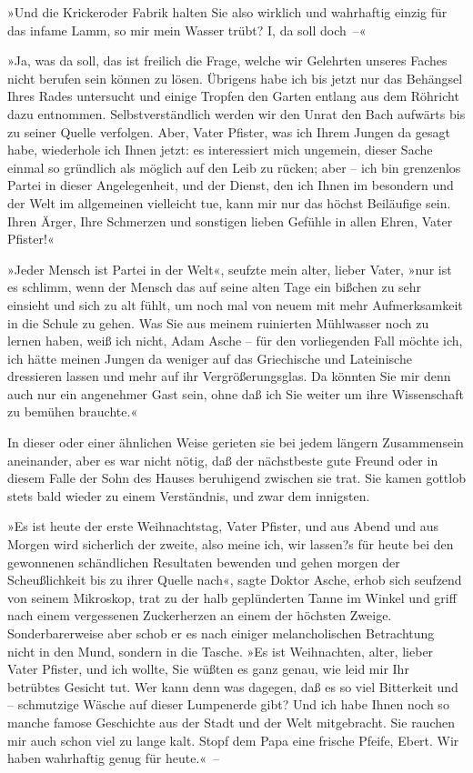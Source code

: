 »Und die Krickeroder Fabrik halten Sie also wirklich und wahrhaftig
einzig für das infame Lamm, so mir mein Wasser trübt? I, da soll
doch~–«

»Ja, was da soll, das ist freilich die Frage, welche wir Gelehrten
unseres Faches nicht berufen sein können zu lösen. Übrigens habe
ich bis jetzt nur das Behängsel Ihres Rades untersucht und einige
Tropfen den Garten entlang aus dem Röhricht dazu entnommen.
Selbstverständlich werden wir den Unrat den Bach aufwärts bis zu
seiner Quelle verfolgen. Aber, Vater Pfister, was ich Ihrem Jungen
da gesagt habe, wiederhole ich Ihnen jetzt: es interessiert mich
ungemein, dieser Sache einmal so gründlich als möglich auf den Leib
zu rücken; aber – ich bin grenzenlos Partei in dieser
Angelegenheit, und der Dienst, den ich Ihnen im besondern und der
Welt im allgemeinen vielleicht tue, kann mir nur das höchst
Beiläufige sein. Ihren Ärger, Ihre Schmerzen und sonstigen lieben
Gefühle in allen Ehren, Vater Pfister!«

»Jeder Mensch ist Partei in der Welt«, seufzte mein alter, lieber
Vater, »nur ist es schlimm, wenn der Mensch das auf seine alten
Tage ein bißchen zu sehr einsieht und sich zu alt fühlt, um noch
mal von neuem mit mehr Aufmerksamkeit in die Schule zu gehen. Was
Sie aus meinem ruinierten Mühlwasser noch zu lernen haben, weiß ich
nicht, Adam Asche – für den vorliegenden Fall möchte ich, ich hätte
meinen Jungen da weniger auf das Griechische und Lateinische
dressieren lassen und mehr auf ihr Vergrößerungsglas. Da könnten
Sie mir denn auch nur ein angenehmer Gast sein, ohne daß ich Sie
weiter um ihre Wissenschaft zu bemühen brauchte.«

In dieser oder einer ähnlichen Weise gerieten sie bei jedem längern
Zusammensein aneinander, aber es war nicht nötig, daß der
nächstbeste gute Freund oder in diesem Falle der Sohn des Hauses
beruhigend zwischen sie trat. Sie kamen gottlob stets bald wieder
zu einem Verständnis, und zwar dem innigsten.

»Es ist heute der erste Weihnachtstag, Vater Pfister, und aus Abend
und aus Morgen wird sicherlich der zweite, also meine ich, wir
lassen?s für heute bei den gewonnenen schändlichen Resultaten
bewenden und gehen morgen der Scheußlichkeit bis zu ihrer Quelle
nach«, sagte Doktor Asche, erhob sich seufzend von seinem
Mikroskop, trat zu der halb geplünderten Tanne im Winkel und griff
nach einem vergessenen Zuckerherzen an einem der höchsten Zweige.
Sonderbarerweise aber schob er es nach einiger melancholischen
Betrachtung nicht in den Mund, sondern in die Tasche. »Es ist
Weihnachten, alter, lieber Vater Pfister, und ich wollte, Sie
wüßten es ganz genau, wie leid mir Ihr betrübtes Gesicht tut. Wer
kann denn was dagegen, daß es so viel Bitterkeit und – schmutzige
Wäsche auf dieser Lumpenerde gibt? Und ich habe Ihnen noch so
manche famose Geschichte aus der Stadt und der Welt mitgebracht.
Sie rauchen mir auch schon viel zu lange kalt. Stopf dem Papa eine
frische Pfeife, Ebert. Wir haben wahrhaftig genug für heute.«~–

